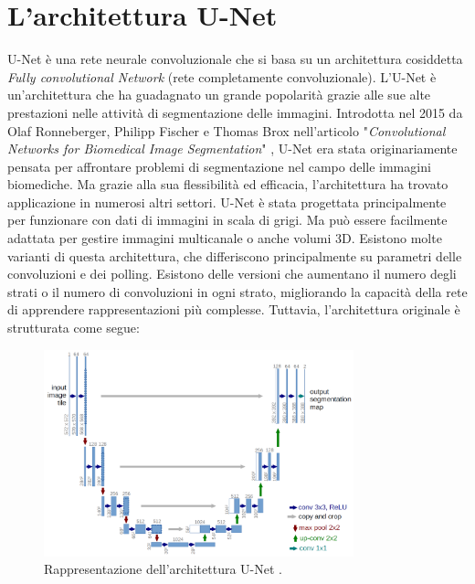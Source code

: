 \section{L'architettura U-Net}
\label{section:U-Net}
U-Net è una rete neurale convoluzionale che si basa su un architettura 
cosiddetta \textit{Fully convolutional Network}  (rete completamente convoluzionale).
L'U-Net è un'architettura che ha guadagnato un grande popolarità 
grazie alle sue alte prestazioni nelle attività di segmentazione delle immagini. 
Introdotta nel 2015 da Olaf Ronneberger, Philipp Fischer e Thomas Brox nell'articolo 
"\textit{Convolutional Networks for Biomedical Image Segmentation}" \cite{ARTICOLO_ORIGINALE_UNET}, 
U-Net era stata originariamente pensata per affrontare problemi di segmentazione 
nel campo delle immagini biomediche. 
Ma grazie alla sua flessibilità ed efficacia, l'architettura ha trovato applicazione 
in numerosi altri settori.
U-Net è stata progettata principalmente per funzionare con dati di immagini in scala di grigi.
Ma può essere facilmente adattata per gestire immagini multicanale o anche volumi 3D.
Esistono molte varianti di questa architettura, che differiscono principalmente su parametri delle 
convoluzioni e dei polling. 
Esistono delle versioni che aumentano il numero degli strati o il numero di convoluzioni in 
ogni strato, migliorando la capacità della rete di apprendere rappresentazioni più complesse. 
Tuttavia, l'architettura originale è strutturata come segue:

\begin{figure}[H]
    \centering
    \includegraphics[width=0.8\textwidth]{Immagini/Generiche/UNET_LARGE.png}
    \caption{Rappresentazione dell'architettura U-Net \cite{ARTICOLO_ORIGINALE_UNET}.}
    \label{fig:UNET_ORIGINAL}
\end{figure}

